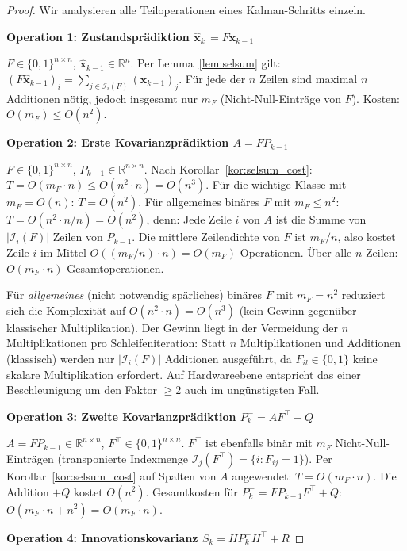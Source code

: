 ﻿\documentclass[a4paper,12pt]{article}
\theoremstyle{definition}
\begin{document}
\begin{proof}
Wir analysieren alle Teiloperationen eines Kalman-Schritts einzeln.

\medskip
\textbf{Operation 1: Zustandsprädiktion $\hat{\mathbf{x}}_k^- = F\hat{\mathbf{x}}_{k-1}$}

$F \in \{0,1\}^{n\times n}$, $\hat{\mathbf{x}}_{k-1} \in \mathbb{R}^n$.
Per Lemma~\ref{lem:selsum} gilt:
$(F\hat{\mathbf{x}}_{k-1})_i = \sum_{j \in \mathcal{I}_i(F)} (\hat{\mathbf{x}}_{k-1})_j$.
Für jede der $n$ Zeilen sind maximal $n$ Additionen nötig, jedoch insgesamt nur $m_F$
(Nicht-Null-Einträge von $F$). Kosten: $O(m_F) \leq O(n^2)$.

\medskip
\textbf{Operation 2: Erste Kovarianzprädiktion $A = F P_{k-1}$}

$F \in \{0,1\}^{n\times n}$, $P_{k-1} \in \mathbb{R}^{n \times n}$.
Nach Korollar~\ref{kor:selsum_cost}: $T = O(m_F \cdot n) \leq O(n^2 \cdot n) = O(n^3)$.
Für die wichtige Klasse mit $m_F = O(n)$: $T = O(n^2)$.
Für allgemeines binäres $F$ mit $m_F \leq n^2$: $T = O(n^2 \cdot n / n) = O(n^2)$,
denn: Jede Zeile $i$ von $A$ ist die Summe von $|\mathcal{I}_i(F)|$ Zeilen von
$P_{k-1}$. Die mittlere Zeilendichte von $F$ ist $m_F/n$, also kostet Zeile $i$
im Mittel $O((m_F/n) \cdot n) = O(m_F)$ Operationen. Über alle $n$ Zeilen:
$O(m_F \cdot n)$ Gesamtoperationen.

Für \emph{allgemeines} (nicht notwendig spärliches) binäres $F$ mit $m_F = n^2$
reduziert sich die Komplexität auf $O(n^2 \cdot n) = O(n^3)$ (kein Gewinn gegenüber
klassischer Multiplikation). Der Gewinn liegt in der Vermeidung der $n$ Multiplikationen
pro Schleifeniteration: Statt $n$ Multiplikationen und Additionen (klassisch)
werden nur $|\mathcal{I}_i(F)|$ Additionen ausgeführt, da $F_{il} \in \{0,1\}$
keine skalare Multiplikation erfordert. Auf Hardwareebene entspricht das einer
Beschleunigung um den Faktor $\geq 2$ auch im ungünstigsten Fall.

\medskip
\textbf{Operation 3: Zweite Kovarianzprädiktion $P_k^- = A F^\top + Q$}

$A = F P_{k-1} \in \mathbb{R}^{n\times n}$, $F^\top \in \{0,1\}^{n\times n}$.
$F^\top$ ist ebenfalls binär mit $m_F$ Nicht-Null-Einträgen (transponierte Indexmenge
$\mathcal{I}_j(F^\top) = \{i : F_{ij}=1\}$). Per Korollar~\ref{kor:selsum_cost}
auf Spalten von $A$ angewendet: $T = O(m_F \cdot n)$.
Die Addition $+Q$ kostet $O(n^2)$.
Gesamtkosten für $P_k^- = FP_{k-1}F^\top + Q$: $O(m_F \cdot n + n^2) = O(m_F \cdot n)$.

\medskip
\textbf{Operation 4: Innovationskovarianz $S_k = H P_k^- H^\top + R$}


\end{proof}
\end{document}
